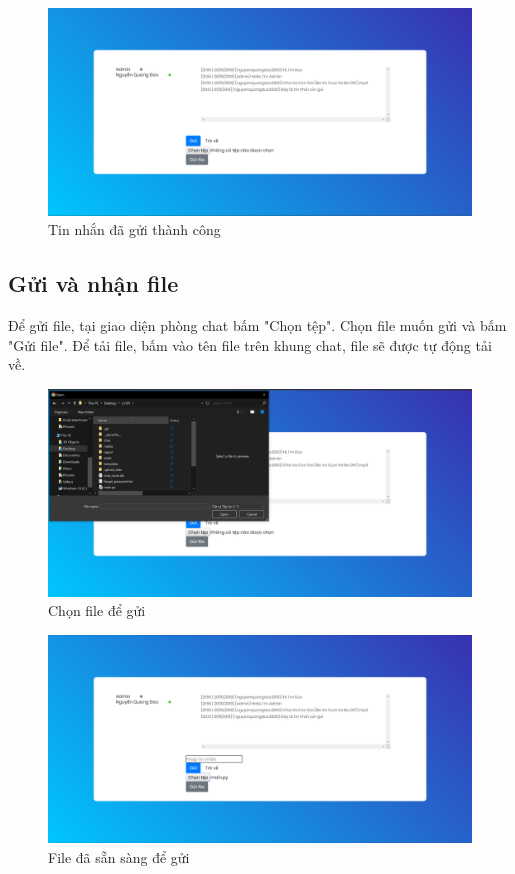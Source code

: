 \documentclass[a4paper]{article}
\begin{document}
	\begin{figure}[H]
		\centering
		\includegraphics[scale=0.36]{send_message_success.png}
		\caption{Tin nhắn đã gửi thành công}
		\label{F:send_message_success}
	\end{figure}
	
	\subsection{Gửi và nhận file}
	Để gửi file, tại giao diện phòng chat bấm "Chọn tệp". Chọn file muốn gửi và bấm "Gửi file".\linebreak
	Để tải file, bấm vào tên file trên khung chat, file sẽ được tự động tải về.
	
	\begin{figure}[H]
		\centering
		\includegraphics[scale=0.36]{send_file.png}
		\caption{Chọn file để gửi}
		\label{F:send_file}
	\end{figure}
	
	\begin{figure}[H]
		\centering
		\includegraphics[scale=0.36]{send_file_prepare.png}
		\caption{File đã sẵn sàng để gửi}
		\label{F:send_file_prepare}
	\end{figure}
	
\end{document}
